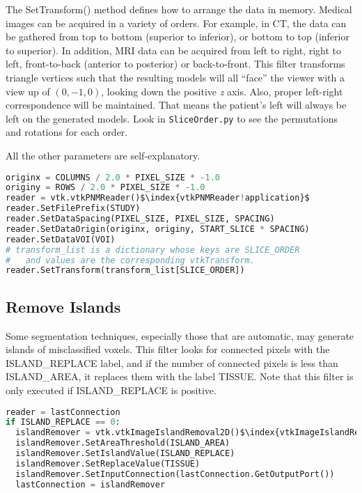 The SetTransform() method defines how to arrange the data in memory. Medical images can be acquired in a variety of orders. For example, in CT, the data can be gathered from top to bottom (superior to inferior), or bottom to top (inferior to superior). In addition, MRI data can be acquired from left to right, right to left, front-to-back (anterior to posterior) or back-to-front. This filter transforms triangle vertices such that the resulting models will all ``face'' the viewer with a view up of $(0,-1,0)$, looking down the positive \emph{z} axis. Also, proper left-right correspondence will be maintained. That means the patient's left will always be left on the generated models. Look in \texttt{SliceOrder.py} to see the permutations and rotations for each order.

All the other parameters are self-explanatory.

\begin{lstlisting}[language=Python, caption={Read the Segmented Volume Data.}, escapechar=\$]
originx = COLUMNS / 2.0 * PIXEL_SIZE * -1.0
originy = ROWS / 2.0 * PIXEL_SIZE * -1.0
reader = vtk.vtkPNMReader()$\index{vtkPNMReader!application}$
reader.SetFilePrefix(STUDY)
reader.SetDataSpacing(PIXEL_SIZE, PIXEL_SIZE, SPACING)
reader.SetDataOrigin(originx, originy, START_SLICE * SPACING)
reader.SetDataVOI(VOI)
# transform_list is a dictionary whose keys are SLICE_ORDER
#   and values are the corresponding vtkTransform.
reader.SetTransform(transform_list[SLICE_ORDER])
\end{lstlisting}

\subsection{Remove Islands}

Some segmentation techniques, especially those that are automatic, may generate islands of misclassified voxels. This filter looks for connected pixels with the ISLAND\_REPLACE label, and if the number of connected pixels is less than ISLAND\_AREA, it replaces them with the label TISSUE. Note that this filter is only executed if ISLAND\_REPLACE is positive.

\begin{lstlisting}[language=Python, caption={Remove Islands.}, escapechar=\$]
reader = lastConnection
if ISLAND_REPLACE == 0:
  islandRemover = vtk.vtkImageIslandRemoval2D()$\index{vtkImageIslandRemoval2D!application}$
  islandRemover.SetAreaThreshold(ISLAND_AREA)
  islandRemover.SetIslandValue(ISLAND_REPLACE)
  islandRemover.SetReplaceValue(TISSUE)
  islandRemover.SetInputConnection(lastConnection.GetOutputPort())
  lastConnection = islandRemover
\end{lstlisting}

